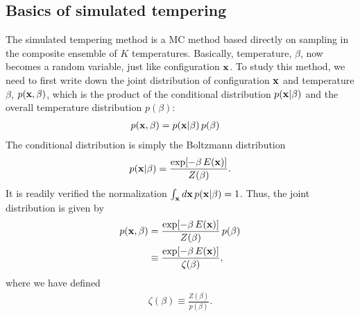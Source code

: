 \documentclass[aip,jcp,preprint,superscriptaddress]{revtex4-1}
\begin{document}
\subsection{Basics of simulated tempering}



The simulated tempering method
is a MC method
based directly on sampling in
the composite ensemble of $K$ temperatures.
%
Basically, temperature, $\beta$,
now becomes a random variable, just like
configuration $\mathbf{x}$.
%
To study this method,
we need to first write down the joint distribution
of configuration $\mathbf{x}$ and temperature $\beta$,
$p(\mathbf{x}, \beta)$, which is the product
of the conditional distribution $p(\mathbf{x} | \beta)$
and the overall temperature distribution $p(\beta)$:
%
\begin{align}
  p(\mathbf{x}, \beta)
  &=
  p(\mathbf{x} | \beta)
  \,
  p(\beta)
\end{align}
%
The conditional distribution
is simply the Boltzmann distribution
%
\begin{align}
  p(\mathbf{x}|\beta)
  =
  \frac{ \exp[-\beta \, E(\mathbf{x})] }
       { Z(\beta) }.
\end{align}
%
It is readily verified the normalization
%
$\int_{\mathbf{x}} d\mathbf{x} \, p(\mathbf{x}|\beta) = 1$.
%
Thus, the joint distribution is
given by
\begin{align}
  p(\mathbf{x}, \beta)
  &=
  \frac{ \exp[-\beta \, E(\mathbf{x})] }
  { Z(\beta) } \, p(\beta)
  \notag \\
  &\equiv
  \frac{ \exp[-\beta \, E(\mathbf{x})] }
  { \zeta(\beta) },
  \label{eq:pjoint_simultemp}
\end{align}
%
where we have defined
\begin{align}
  \zeta(\beta)
  \equiv
  \frac{ Z(\beta) }
  { p(\beta) }.
  \label{eq:weight_simultemp}
\end{align}
\end{document}
